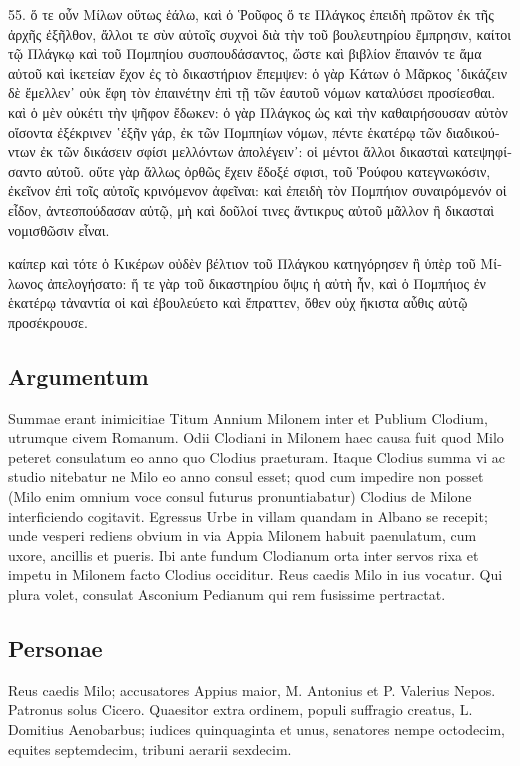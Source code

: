\begin{greek}
55. ὅ τε οὖν Μίλων οὕτως ἑάλω, καὶ ὁ Ῥοῦφος ὅ τε Πλάγκος ἐπειδὴ πρῶτον ἐκ τῆς ἀρχῆς ἐξῆλθον, ἄλλοι τε σὺν αὐτοῖς συχνοὶ διὰ τὴν τοῦ βουλευτηρίου ἔμπρησιν, καίτοι τῷ Πλάγκῳ καὶ τοῦ Πομπηίου συσπουδάσαντος, ὥστε καὶ βιβλίον ἔπαινόν τε ἅμα αὐτοῦ καὶ ἱκετείαν ἔχον ἐς τὸ δικαστήριον ἔπεμψεν: ὁ γὰρ Κάτων ὁ Μᾶρκος ῾δικάζειν δὲ ἔμελλεν᾽ οὐκ ἔφη τὸν ἐπαινέτην ἐπὶ τῇ τῶν ἑαυτοῦ νόμων καταλύσει προσίεσθαι. καὶ ὁ μὲν οὐκέτι τὴν ψῆφον ἔδωκεν: ὁ γὰρ Πλάγκος ὡς καὶ τὴν καθαιρήσουσαν αὐτὸν οἴσοντα ἐξέκρινεν ῾ἐξῆν γάρ, ἐκ τῶν Πομπηίων νόμων, πέντε ἑκατέρῳ τῶν διαδικούντων ἐκ τῶν δικάσειν σφίσι μελλόντων ἀπολέγειν᾽: οἱ μέντοι ἄλλοι δικασταὶ κατεψηφίσαντο αὐτοῦ. οὔτε γὰρ ἄλλως ὀρθῶς ἔχειν ἔδοξέ σφισι, τοῦ Ῥούφου κατεγνωκόσιν, ἐκεῖνον ἐπὶ τοῖς αὐτοῖς κρινόμενον ἀφεῖναι: καὶ ἐπειδὴ τὸν Πομπήιον συναιρόμενόν οἱ εἶδον, ἀντεσπούδασαν αὐτῷ, μὴ καὶ δοῦλοί τινες ἄντικρυς αὐτοῦ μᾶλλον ἢ δικασταὶ νομισθῶσιν εἶναι. 

καίπερ καὶ τότε ὁ Κικέρων οὐδὲν βέλτιον τοῦ Πλάγκου κατηγόρησεν ἢ ὑπὲρ τοῦ Μίλωνος ἀπελογήσατο: ἥ τε γὰρ τοῦ δικαστηρίου ὄψις ἡ αὐτὴ ἦν, καὶ ὁ Πομπήιος ἐν ἑκατέρῳ τἀναντία οἱ καὶ ἐβουλεύετο καὶ ἔπραττεν, ὅθεν οὐχ ἥκιστα αὗθις αὐτῷ προσέκρουσε. 

\end{greek}

\subsection*{Argumentum}

Summae erant inimicitiae Titum Annium Milonem inter et Publium Clodium, utrumque civem Romanum. Odii Clodiani in Milonem haec causa fuit quod Milo peteret consulatum eo anno quo Clodius praeturam. Itaque Clodius summa vi ac studio nitebatur ne Milo eo anno consul esset; quod cum impedire non posset (Milo enim omnium voce consul futurus pronuntiabatur) Clodius de Milone interficiendo cogitavit. Egressus Urbe in villam quandam in Albano se recepit; unde vesperi rediens obvium in via Appia Milonem habuit paenulatum, cum uxore, ancillis et pueris. Ibi ante fundum Clodianum orta inter servos rixa et impetu in Milonem facto Clodius occiditur. Reus caedis Milo in ius vocatur. Qui plura volet, consulat Asconium Pedianum qui rem fusissime pertractat.

\subsection*{Personae}

Reus caedis Milo; accusatores Appius maior, M. Antonius et P. Valerius Nepos. Patronus solus Cicero. Quaesitor extra ordinem, populi suffragio creatus, L. Domitius Aenobarbus; iudices quinquaginta et unus, senatores nempe octodecim, equites septemdecim, tribuni aerarii sexdecim.

